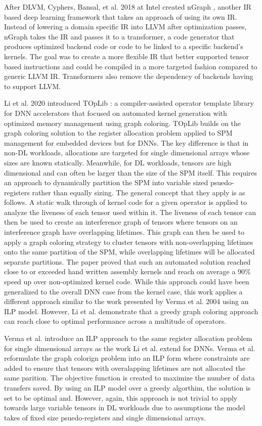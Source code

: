 After DLVM, Cyphers, Bansal, et al. 2018 at Intel created nGraph \cite{nGraph},
another IR based deep learning framework that takes an approach of using its
own IR. Instead of lowering a domain specific IR into LLVM after optimization
passes, nGraph takes the IR and passes it to a transformer, a code generator
that produces optimized backend code or code to be linked to a specific
backend's kernels. The goal was to create a more flexible IR that better supported
tensor based instructions and could be compiled in a more targeted fashion compared
to generic LLVM IR. Transformers also remove the dependency of backends having
to support LLVM.

Li et al. 2020 introduced TOpLib \cite{toplib}: a compiler-assisted operator
template library for DNN accelerators that focused on automated kernel
generation with optimized memory management using graph coloring. TOpLib builds
on the graph coloring solution to the register allocation problem applied to
SPM management for embedded devices but for DNNs. The key difference is that
in non-DL workloads, allocations are targeted for single dimensional arrays
whose sizes are known statically. Meanwhile, for DL workloads, tensors are high
dimensional and can often be larger than the size of the SPM itself.  This
requires an approach to dynamically partition the SPM into variable sized
psuedo-registers rather than equally sizing. The general concept that they
apply is as follows. A static walk through of kernel code for a given operator
is applied to analyze the liveness of each tensor used within it.  The liveness
of each tensor can then be used to create an interference graph of tensors
where tensors on an interference graph have overlapping lifetimes.  This graph
can then be used to apply a graph coloring strategy to cluster tensors with
non-overlapping lifetimes onto the same partition of the SPM, while overlapping
lifetimes will be allocated separate partitions. The paper proved that
such an automated solution reached close to or exceeded hand written assembly
kernels and reach on average a 90\% speed up over non-optimized kernel code.
While this approach could have been generalized to the overall DNN case from the
kernel case, this work applies a different approach similar to the work presented
by Verma et al. 2004 using an ILP model. However, Li et al. demonstrate that
a greedy graph coloring approach can reach close to optimal performance across
a multitude of operators.

Verma et al. \cite{verma} introduce an ILP approach to the same register
allocation problem for single dimensional arrays as the work Li et al. extend
for DNNs. Verma et al.  reformulate the graph colorign problem into an ILP form
where constraints are added to ensure that tensors with overalapping lifetimes
are not allocated the same parition. The objective function is created to
maximize the number of data transfers saved. By using an ILP model over a
greedy algorthim, the solution is set to be optimal and. However, again, this
approach is not trivial to apply towards large variable tensors in DL workloads
due to assumptions the model takes of fixed size psuedo-registers and single
dimensional arrays.

